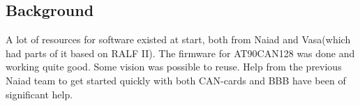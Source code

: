\subsection{Background}
\noindent A lot of resources for software existed at start, both from Naiad and Vasa(which had parts of it based on RALF II\cite{Ralf_II}). The firmware for AT90CAN128 \cite{at90can128} was done and working quite good. Some vision was possible to reuse. Help from the previous Naiad team to get started quickly with both CAN-cards and BBB have been of significant help. %
